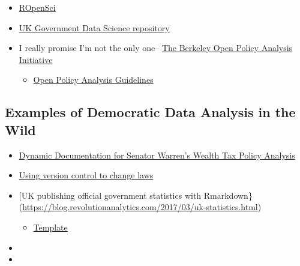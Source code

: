 \documentclass[]{book}
\providecommand{\tightlist}{%
  \setlength{\itemsep}{0pt}\setlength{\parskip}{0pt}}
\begin{document}
\begin{itemize}
\tightlist
\item
  \href{https://ropensci.org}{ROpenSci}
\item
  \href{https://github.com/ukgovdatascience}{UK Government Data Science repository}
\item
  I really promise I'm not the only one-- \href{https://www.bitss.org/opa/}{The Berkeley Open Policy Analysis Initiative}

  \begin{itemize}
  \tightlist
  \item
    \href{https://www.bitss.org/wp-content/uploads/2019/03/OPA-Guidelines.pdf}{Open Policy Analysis Guidelines}
  \end{itemize}
\end{itemize}

\hypertarget{examples-of-democratic-data-analysis-in-the-wild}{%
\subsection{Examples of Democratic Data Analysis in the Wild}\label{examples-of-democratic-data-analysis-in-the-wild}}

\begin{itemize}
\item
  \href{http://wealthtaxsimulator.org/analysis/}{Dynamic Documentation for Senator Warren's Wealth Tax Policy Analysis}
\item
  \href{https://arstechnica.com/tech-policy/2018/11/how-i-changed-the-law-with-a-github-pull-request/}{Using version control to change laws}
\item
  {[}UK publishing official government statistics with Rmarkdown\}(\url{https://blog.revolutionanalytics.com/2017/03/uk-statistics.html})

  \begin{itemize}
  \tightlist
  \item
    \href{https://ukgovdatascience.github.io/govdown/}{Template}
  \end{itemize}
\item
\item
\end{itemize}


\end{document}

